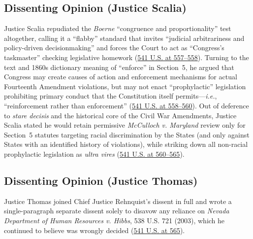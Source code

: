 \documentclass[12pt]{article}
\begin{document}
\subsection{Dissenting Opinion (Justice Scalia)}
Justice Scalia repudiated the \textit{Boerne} ``congruence and proportionality'' test altogether, calling it a ``flabby'' standard that invites ``judicial arbitrariness and policy-driven decisionmaking'' and forces the Court to act as ``Congress's taskmaster'' checking legislative homework (\href{https://www.law.cornell.edu/supremecourt/text/541/509}{541 U.S. at 557--558}). Turning to the text and 1860s dictionary meaning of ``enforce'' in Section~5, he argued that Congress may create causes of action and enforcement mechanisms for actual Fourteenth Amendment violations, but may not enact ``prophylactic'' legislation prohibiting primary conduct that the Constitution itself permits---\textit{i.e.}, ``reinforcement rather than enforcement'' (\href{https://www.law.cornell.edu/supremecourt/text/541/509}{541 U.S. at 558--560}). Out of deference to \textit{stare decisis} and the historical core of the Civil War Amendments, Justice Scalia stated he would retain permissive \textit{McCulloch v. Maryland} review only for Section~5 statutes targeting racial discrimination by the States (and only against States with an identified history of violations), while striking down all non-racial prophylactic legislation as \textit{ultra vires} (\href{https://www.law.cornell.edu/supremecourt/text/541/509}{541 U.S. at 560--565}).

\subsection{Dissenting Opinion (Justice Thomas)}
Justice Thomas joined Chief Justice Rehnquist's dissent in full and wrote a single-paragraph separate dissent solely to disavow any reliance on \textit{Nevada Department of Human Resources v. Hibbs}, 538 U.S. 721 (2003), which he continued to believe was wrongly decided (\href{https://www.law.cornell.edu/supremecourt/text/541/509}{541 U.S. at 565}).
\end{document}
